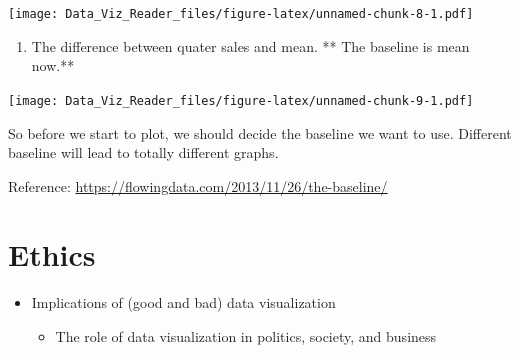 \documentclass[]{book}
\newenvironment{Shaded}{\begin{snugshade}}{\end{snugshade}}
\newcommand{\KeywordTok}[1]{\textcolor[rgb]{0.13,0.29,0.53}{\textbf{#1}}}
\newcommand{\DataTypeTok}[1]{\textcolor[rgb]{0.13,0.29,0.53}{#1}}
\newcommand{\DecValTok}[1]{\textcolor[rgb]{0.00,0.00,0.81}{#1}}
\newcommand{\StringTok}[1]{\textcolor[rgb]{0.31,0.60,0.02}{#1}}
\newcommand{\CommentTok}[1]{\textcolor[rgb]{0.56,0.35,0.01}{\textit{#1}}}
\newcommand{\OtherTok}[1]{\textcolor[rgb]{0.56,0.35,0.01}{#1}}
\newcommand{\ControlFlowTok}[1]{\textcolor[rgb]{0.13,0.29,0.53}{\textbf{#1}}}
\newcommand{\OperatorTok}[1]{\textcolor[rgb]{0.81,0.36,0.00}{\textbf{#1}}}
\newcommand{\NormalTok}[1]{#1}
\providecommand{\tightlist}{%
  \setlength{\itemsep}{0pt}\setlength{\parskip}{0pt}}
\theoremstyle{definition}
\theoremstyle{definition}
\theoremstyle{definition}
\theoremstyle{remark}
\begin{document}
\texttt{[image: Data\_Viz\_Reader\_files/figure-latex/unnamed-chunk-8-1.pdf]}

\begin{enumerate}
\def\labelenumi{\arabic{enumi}.}
\setcounter{enumi}{4}
\tightlist
\item
  The difference between quater sales and mean. ** The baseline is mean
  now.**
\end{enumerate}

\begin{Shaded}
\end{Shaded}

\texttt{[image: Data\_Viz\_Reader\_files/figure-latex/unnamed-chunk-9-1.pdf]}

So before we start to plot, we should decide the baseline we want to
use. Different baseline will lead to totally different graphs.

Reference: \url{https://flowingdata.com/2013/11/26/the-baseline/}

\chapter{Ethics}\label{ethics}

\begin{itemize}
\tightlist
\item
  Implications of (good and bad) data visualization

  \begin{itemize}
  \tightlist
  \item
    The role of data visualization in politics, society, and business
  \end{itemize}
\end{itemize}
\end{document}
